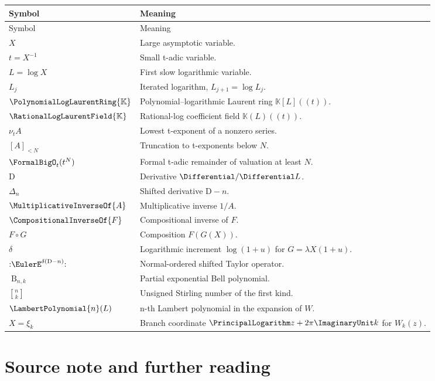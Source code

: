 \documentclass[11pt,openany]{book}
\theoremstyle{definition}
\theoremstyle{plain}
\theoremstyle{remark}
\newcommand{\K}{\mathbb{K}}
\newcommand{\val}{\nu}
\newcommand{\Bell}{\operatorname{B}}
\newcommand{\rev}[1]{\CompositionalInverseOf{#1}}
\newcommand{\recip}[1]{\MultiplicativeInverseOf{#1}}
\newcommand{\stirlingone}[2]{\genfrac{[}{]}{0pt}{}{#1}{#2}}
\newcommand{\Dop}{\mathrm{D}}
\newcommand{\compose}{\mathbin{\circ}}
\begin{document}
\begin{longtable}{@{}p{}p{}@{}}
\toprule
Symbol & Meaning \\
\midrule
\endfirsthead
\toprule
Symbol & Meaning \\
\midrule
\endhead
\(X\) & Large asymptotic variable. \\
\(t=X^{-1}\) & Small t-adic variable. \\
\(L=\log X\) & First slow logarithmic variable. \\
\(L_j\) & Iterated logarithm, \(L_{j+1}=\log L_j\). \\
\(\PolynomialLogLaurentRing{\K}\) & Polynomial--logarithmic Laurent ring \(\K[L]((t))\). \\
\(\RationalLogLaurentField{\K}\) & Rational-log coefficient field \(\K(L)((t))\). \\
\(\val_t A\) & Lowest t-exponent of a nonzero series. \\
\([A]_{<N}\) & Truncation to t-exponents below \(N\). \\
\(\FormalBigO_t(t^N)\) & Formal t-adic remainder of valuation at least \(N\). \\
\(\Dop\) & Derivative \(\Differential/\Differential L\). \\
\(\Delta_n\) & Shifted derivative \(\Dop-n\). \\
\(\recip A\) & Multiplicative inverse \(1/A\). \\
\(\rev F\) & Compositional inverse of \(F\). \\
\(F\compose G\) & Composition \(F(G(X))\). \\
\(\delta\) & Logarithmic increment \(\log(1+u)\) for
\(G=\lambda X(1+u)\). \\
\(\mathopen{:}\EulerE^{\delta(\Dop-n)}\mathclose{:}\) & Normal-ordered shifted
Taylor operator. \\
\(\Bell_{n,k}\) & Partial exponential Bell polynomial. \\
\(\stirlingone{n}{k}\) & Unsigned Stirling number of the first kind. \\
\(\LambertPolynomial{n}(L)\) & n-th Lambert polynomial in the expansion of \(W\). \\
\(X=\xi_k\) & Branch coordinate \(\PrincipalLogarithm z+2\pi\ImaginaryUnit k\) for \(W_k(z)\). \\
\bottomrule
\end{longtable}


\backmatter

\chapter*{Source note and further reading}
\end{document}

